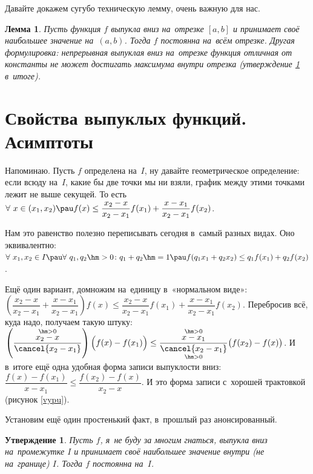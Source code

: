 \documentclass[a4paper,10pt,twoside]{article}
\newtheorem{Th}{Лемма}[section]
\newtheorem{Ut}{Утверждение}[section]
\let\AVsection\section{}
\renewcommand\section{\newpage\scol\AVsection}
\newcommand{\scol}{  \renewcommand{\headrulewidth}{0.5pt}\fancyhead[RE,LO]{\thesection{} \leftmark} \fancyhead[LE,RO]{\thepage}}
\begin{document}
Давайте докажем сугубо техническую лемму, очень важную для нас.

\begin{Th}
    Пусть функция $f$ выпукла вниз на~отрезке $[a,b]$ и принимает своё наибольшее значение на~$(a,b)$. Тогда $f$ постоянна на~всём отрезке.
    Другая формулировка: непрерывная выпуклая вниз на~отрезке функция отличная от константы не может достигать максимума внутри отрезка (утверждение \ref{gnat} в~итоге).
\end{Th}


\section{Свойства выпуклых функций. Асимптоты}

Напоминаю. Пусть $f$ определена на~$I$, ну давайте геометрическое определение: если всюду на~$I$, какие бы две точки мы ни взяли, график
между этими точками лежит не выше секущей. То есть \\$\forall\  x\in(x_1,x_2)\pau f(x)\leq\dfrac{x_2-x}{x_2-x_1}f(x_1)+\dfrac{x-x_1}{x_2-x_1}f(x_2)$.

Нам это равенство полезно переписывать сегодня в~самый разных видах. Оно эквивалентно: \\$\forall\  x_1,x_2\in I\pau \forall\  q_1,q_2\hm>0\colon q_1+q_2\hm=1
\pau f(q_1x_1+q_2x_2)\leq q_1f(x_1)+q_2f(x_2)$.

Ещё один вариант, домножим на~единицу в~«нормальном виде»: \\$\left(\dfrac{x_2-x}{x_2-x_1}+\dfrac{x-x_1}{x_2-x_1}\right)f(x)\leq
\dfrac{x_2-x}{x_2-x_1}f(x_1)+\dfrac{x-x_1}{x_2-x_1}f(x_2)$. Перебросив всё, куда надо, получаем такую штуку:
 $\left(\dfrac{\overset{\hm>0}{x_2-x}}{\cancel{x_2-x_1}}\right)
\Big(f(x)-f(x_1)\Big)\leq
\dfrac{\overset{\hm>0}{x-x_1}}{\underset{\hm>0}{\cancel{x_2-x_1}}}\big(f(x_2)-f(x)\big)$.
И в~итоге ещё одна удобная форма записи выпуклости вниз:
$\dfrac{f(x)-f(x_1)}{x-x_1}\leq\dfrac{f(x_2)-f(x)}{x_2-x}$. И это форма записи с~хорошей трактовкой (рисунок \ref{vypu}).


Установим ещё один простенький факт, в~прошлый раз анонсированный.

\begin{Ut}\label{gnat}
    Пусть $f$, я~не буду за многим гнаться, выпукла вниз на~промежутке $I$ и принимает своё наибольшее значение внутри (не на~границе) $I$.
     Тогда $f$ постоянна на~$I$.
\end{Ut}
\end{document}
